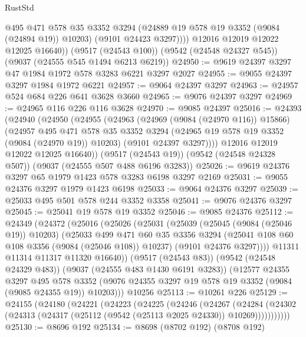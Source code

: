 \begin{lexlean}{RustStd}
\begin{coremodule}
              @495
              @471
              @578
              @35
              @3352
              @3294
              (@24889 @19 @578 @19 @3352 (@9084 (@24894 @19)) @10203)
              (@9101 @24423 @3297))))
        @12016
        @12019
        @12022
        @12025
        @16640))
    (@9517 (@24543 @100))
    (@9542 (@24548 @24327 @545))
    (@9037 (@24555 @545 @1494 @6213 @6219))
@24950 := @9619 @24397 @3297 @47 @1984 @1972 @578 @3283 @6221 @3297 @2027
@24955 := @9055 @24397 @3297 @1984 @1972 @6221
@24957 := @9064 @24397 @3297
@24963 := @24957 @524 @684 @226 @641 @3628 @3660
@24965 := @9076 @24397 @3297
@24969 := @24965 @116 @226 @116 @3628
@24970 := @9085 @24397
@25016 := @24393
    (@24940
      (@24950
        (@24955
          (@24963
            (@24969 (@9084 (@24970 @116)) @15866)
            (@24957
              @495
              @471
              @578
              @35
              @3352
              @3294
              (@24965 @19 @578 @19 @3352 (@9084 (@24970 @19)) @10203)
              (@9101 @24397 @3297))))
        @12016
        @12019
        @12022
        @12025
        @16640))
    (@9517 (@24543 @19))
    (@9542 (@24548 @24328 @507))
    (@9037 (@24555 @507 @488 @6196 @3283))
@25026 := @9619 @24376 @3297 @65 @1979 @1423 @578 @3283 @6198 @3297 @2169
@25031 := @9055 @24376 @3297 @1979 @1423 @6198
@25033 := @9064 @24376 @3297
@25039 := @25033 @495 @501 @578 @244 @3352 @3358
@25041 := @9076 @24376 @3297
@25045 := @25041 @19 @578 @19 @3352
@25046 := @9085 @24376
@25112 := @24349
    (@24372
      (@25016
        (@25026
          (@25031
            (@25039
              (@25045 (@9084 (@25046 @19)) @10203)
              (@25033
                @499
                @471
                @60
                @35
                @3356
                @3294
                (@25041 @108 @60 @108 @3356 (@9084 (@25046 @108)) @10237)
                (@9101 @24376 @3297))))
          @11311
          @11314
          @11317
          @11320
          @16640))
      (@9517 (@24543 @83))
      (@9542 (@24548 @24329 @483))
      (@9037 (@24555 @483 @1430 @6191 @3283))
      (@12577
        @24355
        @3297
        @495
        @578
        @3352
        (@9076 @24355 @3297 @19 @578 @19 @3352 (@9084 (@9085 @24355 @19)) @10203)))
    @10256
@25113 := @10261 @226
@25129 := @24155
    (@24180
      (@24221
        (@24223
          (@24225
            (@24246
              (@24267
                (@24284
                  (@24302 (@24313 (@24317 (@25112 (@9542 (@25113 @2025 @24330)) @10269)))))))))))
@25130 := @8696 @192
@25134 := @8698 (@8702 @192) (@8708 @192)

\end{coremodule}
\end{lexlean}
